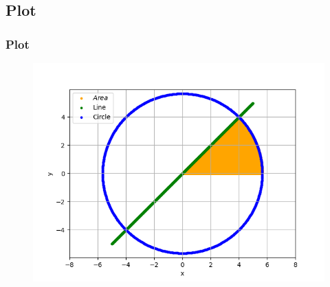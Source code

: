 \documentclass{beamer}
\theoremstyle{remark}
\numberwithin{equation}{section}
\begin{document}
\subsection{Plot}
\begin{frame}
\frametitle{Plot}
\begin{figure}[h]
\centering
\includegraphics[scale=0.7]{figs/graph.png}
\label{Fig}
\end{figure}

\end{frame}
\end{document}
